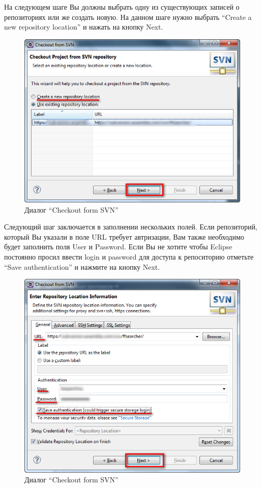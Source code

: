 \documentclass[a4paper,12pt]{article}
\begin{document}
На следующем шаге Вы должны выбрать одну из существующих записей о
репозиториях или же создать новую. На данном шаге нужно выбрать ``Create
a new repository location'' и нажать на кнопку Next.

\begin{figure}[h!]
	\centering
	\includegraphics[scale=0.80]{eclipse-checkout-step-3.png}
	\vspace{-10pt}
	\caption{Диалог ``Checkout form SVN''}
\end{figure}

Следующий шаг заключается в заполнении нескольких полей. Если
репозиторий, который Вы указали в поле URL требует автризации, Вам также
необходимо будет заполнить поля User и Password. Если Вы не хотите чтобы
Eclipse постоянно просил ввести login и password для доступа к
репоситорию отметьте ``Save authentication'' и нажмите на кнопку Next.

\begin{figure}[h!]
	\centering
	\includegraphics[scale=0.80]{eclipse-checkout-step-4.png}
	\vspace{-10pt}
	\caption{Диалог ``Checkout form SVN''}
\end{figure}
\end{document}
